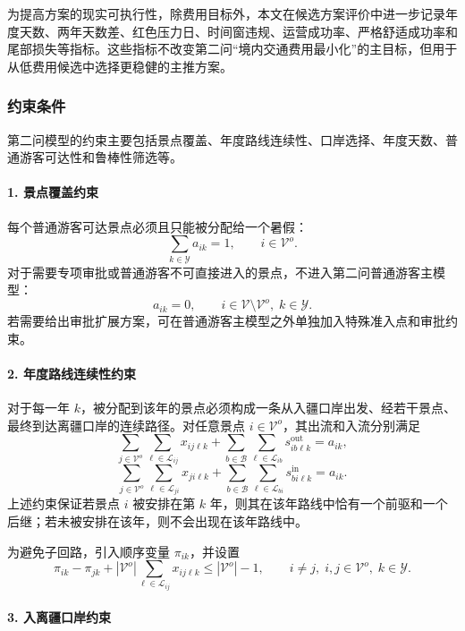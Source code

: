 \documentclass[UTF8,zihao=-4,a4paper]{ctexart}
\begin{document}
为提高方案的现实可执行性，除费用目标外，本文在候选方案评价中进一步记录年度天数、两年天数差、红色压力日、时间窗违规、运营成功率、严格舒适成功率和尾部损失等指标。这些指标不改变第二问“境内交通费用最小化”的主目标，但用于从低费用候选中选择更稳健的主推方案。

\subsubsection{约束条件}
\label{subsubsec:q2_constraints}

第二问模型的约束主要包括景点覆盖、年度路线连续性、口岸选择、年度天数、普通游客可达性和鲁棒性筛选等。

\paragraph{1. 景点覆盖约束}

每个普通游客可达景点必须且只能被分配给一个暑假：
\[
\sum_{k\in\mathcal{Y}} a_{ik}=1,
\qquad i\in\mathcal{V}^{o}.
\]
对于需要专项审批或普通游客不可直接进入的景点，不进入第二问普通游客主模型：
\[
a_{ik}=0,
\qquad i\in\mathcal{V}\setminus\mathcal{V}^{o},\; k\in\mathcal{Y}.
\]
若需要给出审批扩展方案，可在普通游客主模型之外单独加入特殊准入点和审批约束。

\paragraph{2. 年度路线连续性约束}

对于每一年 $k$，被分配到该年的景点必须构成一条从入疆口岸出发、经若干景点、最终到达离疆口岸的连续路径。对任意景点 $i\in\mathcal{V}^{o}$，其出流和入流分别满足
\[
\sum_{j\in\mathcal{V}^{o}}
\sum_{\ell\in\mathcal{L}_{ij}}x_{ij\ell k}
+
\sum_{b\in\mathcal{B}}
\sum_{\ell\in\mathcal{L}_{ib}}s_{ib\ell k}^{\mathrm{out}}
=
a_{ik},
\]
\[
\sum_{j\in\mathcal{V}^{o}}
\sum_{\ell\in\mathcal{L}_{ji}}x_{ji\ell k}
+
\sum_{b\in\mathcal{B}}
\sum_{\ell\in\mathcal{L}_{bi}}s_{bi\ell k}^{\mathrm{in}}
=
a_{ik}.
\]
上述约束保证若景点 $i$ 被安排在第 $k$ 年，则其在该年路线中恰有一个前驱和一个后继；若未被安排在该年，则不会出现在该年路线中。

为避免子回路，引入顺序变量 $\pi_{ik}$，并设置
\[
\pi_{ik}-\pi_{jk}
+
|\mathcal{V}^{o}|
\sum_{\ell\in\mathcal{L}_{ij}}x_{ij\ell k}
\leq
|\mathcal{V}^{o}|-1,
\qquad i\neq j,\; i,j\in\mathcal{V}^{o},\; k\in\mathcal{Y}.
\]

\paragraph{3. 入离疆口岸约束}
\end{document}
